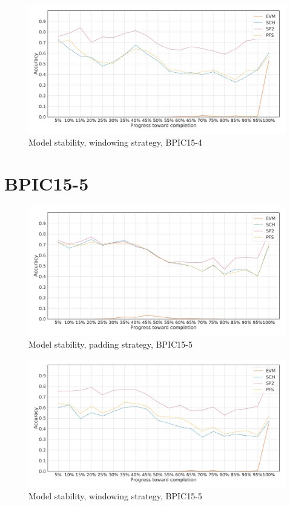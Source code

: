 \begin{figure}[!htb]
    \centering
    \includegraphics[width=\textwidth]{gfx/bpic2015_4/windowed_stability.pdf}
    \caption{Model stability, windowing strategy, BPIC15-4}
    \label{fig:bpic15-4-windowed-stability}
\end{figure}

\FloatBarrier
\section*{BPIC15-5}\label{appendix:stability:2015-5}
\begin{figure}[!htb]
    \centering
    \includegraphics[width=\textwidth]{gfx/bpic2015_5/padded_stability.pdf}
    \caption{Model stability, padding strategy, BPIC15-5}
    \label{fig:bpic15-5-padded-stability}
\end{figure}
\begin{figure}[!htb]
    \centering
    \includegraphics[width=\textwidth]{gfx/bpic2015_5/windowed_stability.pdf}
    \caption{Model stability, windowing strategy, BPIC15-5}
    \label{fig:bpic15-5-windowed-stability}
\end{figure}
\FloatBarrier

